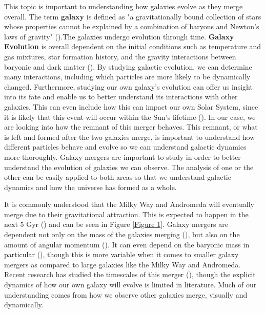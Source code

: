 \documentclass[twocolumn]{aastex631}
\begin{document}
This topic is important to understanding how galaxies evolve as they merge overall. The term \textbf{galaxy} is defined as "a gravitationally bound collection of stars whose properties cannot be explained by a combination of baryons and Newton's laws of gravity" (\cite{Willman_2012}).The galaxies undergo evolution through time. \textbf{Galaxy Evolution} is overall dependent on the initial conditions such as temperature and gas mixtures, star formation history, and the gravity interactions between baryonic and dark matter (\cite{Matteucci_2003}). 
By studying galactic evolution, we can determine many interactions, including which particles are more likely to be dynamically changed. Furthermore, studying our own galaxy's evolution can offer us insight into its fate and enable us to better understand its interactions with other galaxies. This can even include how this can impact our own Solar System, since it is likely that this event will occur within the Sun's lifetime (\cite{Cox_2008}). In our case, we are looking into how the remnant of this merger behaves. This remnant, or what is left and formed after the two galaxies merge, is important to understand how different particles behave and evolve so we can understand galactic dynamics more thoroughly. Galaxy mergers are important to study in order to better understand the evolution of galaxies we can observe. The analysis of one or the other can be easily applied to both areas so that we understand galactic dynamics and how the universe has formed as a whole. 

It is commonly understood that the Milky Way and Andromeda will eventually merge due to their gravitational attraction. This is expected to happen in the next 5 Gyr (\cite{Cox_2008}) and can be seen in Figure \ref{Figure 1}. Galaxy mergers are dependent not only on the mass of the galaxies merging (\cite{10.1111/j.1365-2966.2010.16268.x}), but also on the amount of angular momentum (\cite{2008ApJS..175..356H}). It can even depend on the baryonic mass in particular (\cite{10.1111/j.1365-2966.2010.16268.x}), though this is more variable when it comes to smaller galaxy mergers as compared to large galaxies like the Milky Way and Andromeda. Recent research has studied the timescales of this merger (\cite{Cox_2008}), though the explicit dynamics of how our own galaxy will evolve is limited in literature. Much of our understanding comes from how we observe other galaxies merge, visually and dynamically. 
\end{document}
